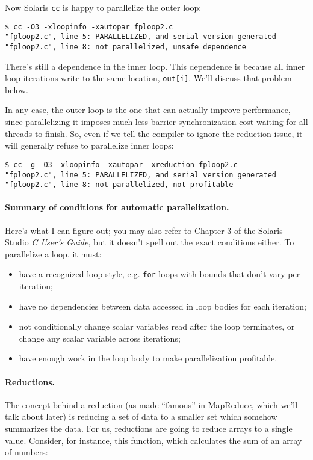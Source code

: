 Now Solaris {\tt cc} is happy to parallelize the outer loop:

{\small 
\begin{verbatim}
$ cc -O3 -xloopinfo -xautopar fploop2.c 
"fploop2.c", line 5: PARALLELIZED, and serial version generated
"fploop2.c", line 8: not parallelized, unsafe dependence
\end{verbatim} 
}

There's still a dependence in the inner loop. This dependence is because
all inner loop iterations write to the same location, {\tt out[i]}. We'll
discuss that problem below.

In any case, the outer loop is the one that can actually improve performance,
since parallelizing it imposes much less barrier synchronization cost 
waiting for all threads to finish. So, even if we tell the compiler to ignore
the reduction issue, it will generally refuse to parallelize inner loops:
{\small 
\begin{verbatim}
$ cc -g -O3 -xloopinfo -xautopar -xreduction fploop2.c 
"fploop2.c", line 5: PARALLELIZED, and serial version generated
"fploop2.c", line 8: not parallelized, not profitable
\end{verbatim} 
}


\paragraph{Summary of conditions for automatic parallelization.} Here's what I 
can figure out; you may also refer to Chapter 3 of the Solaris Studio
\emph{C User's Guide}, but it doesn't spell out the exact conditions
either. To parallelize a loop, it must:
\begin{itemize}
\item have a recognized loop style, e.g. {\tt for} loops with
bounds that don't vary per iteration;
\item have no dependencies between data accessed in loop bodies for
  each iteration;
\item not conditionally change scalar variables read after the loop
  terminates, or change any scalar variable across iterations;
\item have enough work in the loop body to make parallelization profitable.
\end{itemize}

\paragraph{Reductions.} The concept behind a 
reduction (as made ``famous'' in MapReduce, which we'll talk about
later) is reducing a set of data to a smaller set which somehow
summarizes the data. For us, reductions are going to reduce
arrays to a single value. Consider, for instance, this function, which
calculates the sum of an array of numbers:

